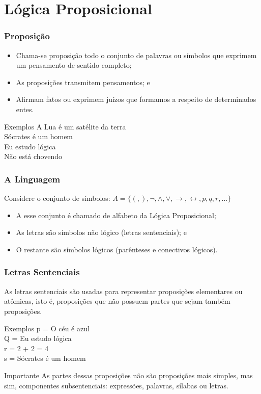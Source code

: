\documentclass{beamer}
\begin{document}
\section{Lógica Proposicional}

\begin{frame}
\frametitle{Proposição}

\begin{itemize}
	\item Chama-se proposição todo o conjunto de palavras ou símbolos que exprimem um pensamento de sentido completo;
	\item As proposições transmitem pensamentos; e
	\item Afirmam fatos ou exprimem juízos que formamos a respeito de determinados entes.
\end{itemize}\vfill

\begin{exampleblock}{Exemplos}
A Lua é um satélite da terra\\
Sócrates é um homem\\
Eu estudo lógica\\
Não está chovendo
\end{exampleblock}
\end{frame}

\begin{frame}
\frametitle{A Linguagem}

\begin{block}{Considere o conjunto de símbolos:}
$ A = \{(,), \neg, \wedge, \vee, \rightarrow, \leftrightarrow, p, q, r, ... \}$
\end{block}\vfill

\begin{itemize}
	\item A esse conjunto é chamado de alfabeto da Lógica Proposicional;
	\item As letras são símbolos não lógico (letras sentenciais); e
	\item O restante são símbolos lógicos (parênteses e conectivos lógicos).
\end{itemize}
\end{frame}

\begin{frame}
\frametitle{Letras Sentenciais}

As letras sentenciais são usadas para representar proposições elementares ou atômicas, isto é, proposições que não possuem partes que sejam também proposições.
\vfill
\begin{exampleblock}{Exemplos}
p = O céu é azul\\
Q = Eu estudo lógica\\
r = 2 + 2 = 4\\
s = Sócrates é um homem
\end{exampleblock} \vfill

\begin{alertblock}{Importante}
As partes dessas proposições não são proposições mais simples, mas sim, componentes subsentenciais: expressões, palavras, sílabas ou letras.
\end{alertblock}
\end{frame}
\end{document}
